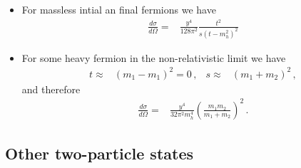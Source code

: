 \begin{itemize}
\item For massless intial an final fermions we have
\begin{align}
    \frac{d\sigma}{d\Omega}
=&\frac{y^4}{128\pi^2}\frac{t^2}{s\left(t-m^2_h\right)^2}
\end{align}
\item For some heavy fermion in the non-relativistic limit we have
\begin{align}
  t\approx& (m_1-m_1)^2=0\,,& 
  s\approx& (m_1+m_2)^2\,,
\end{align}
and therefore
\begin{align}
      \frac{d\sigma}{d\Omega}
=&\frac{y^4}{32\pi^2m_h^4}\left(\frac{m_1m_2}{m_1+m_2}\right)^2\,.
\end{align}

\end{itemize}

\subsection{Other two-particle states}

